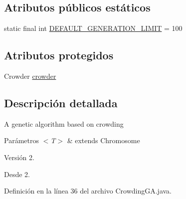 \subsection*{Atributos públicos estáticos}
\begin{DoxyCompactItemize}
\item 
static final int \hyperlink{classjenes_1_1algorithms_1_1_crowding_g_a_3_01_t_01extends_01_chromosome_01_4_afb96c2e73129293b45044998e3614c06}{D\-E\-F\-A\-U\-L\-T\-\_\-\-G\-E\-N\-E\-R\-A\-T\-I\-O\-N\-\_\-\-L\-I\-M\-I\-T} = 100
\end{DoxyCompactItemize}
\subsection*{Atributos protegidos}
\begin{DoxyCompactItemize}
\item 
Crowder \hyperlink{classjenes_1_1algorithms_1_1_crowding_g_a_3_01_t_01extends_01_chromosome_01_4_aa747112afbb20cb4faec643ccc73e396}{crowder}
\end{DoxyCompactItemize}


\subsection{Descripción detallada}
A genetic algorithm based on crowding


\begin{DoxyParams}{Parámetros}
{\em $<$\-T$>$} & extends Chromosome\\
\hline
\end{DoxyParams}
\begin{DoxyVersion}{Versión}
2. 
\end{DoxyVersion}
\begin{DoxySince}{Desde}
2. 
\end{DoxySince}


Definición en la línea 36 del archivo Crowding\-G\-A.\-java.



